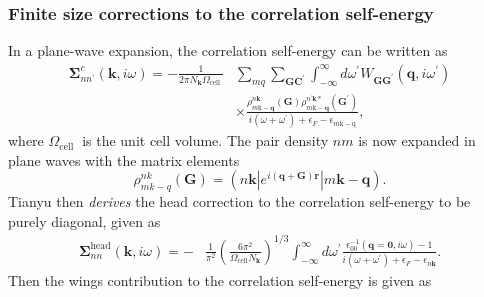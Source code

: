 \subsubsection{Finite size corrections to the correlation self-energy}
In a plane-wave expansion, the correlation self-energy can be written as 
\begin{align}
    \mathbf{\Sigma}_{n n^{\prime}}^c(\mathbf{k}, i \omega)=-\frac{1}{2 \pi N_{\mathbf{k}} \Omega_{\text {cell }}} & \sum_{m q} \sum_{\mathbf{G C}^{\prime}} \int_{-\infty}^{\infty} d \omega^{\prime} W_{\mathbf{G G}^{\prime}}\left(\mathbf{q}, i \omega^{\prime}\right) \\
& \times \frac{\rho_{m \mathrm{k}-\mathbf{q}}^{n \mathbf{k}}(\mathbf{G}) \rho_{m \mathrm{k}-\mathbf{q}}^{n^{\prime} \mathbf{k *}}\left(\mathbf{G}^{\prime}\right)}{i\left(\omega+\omega^{\prime}\right)+\epsilon_F-\epsilon_{m \mathrm{k-q}}},
\end{align}
where $\Omega_{\text {cell }}$ is the unit cell volume. The pair density $n m$ is now expanded in plane waves with the matrix elements
\begin{equation}
    \rho_{m k-q}^{n k}(\mathbf{G})=\left(n \mathbf{k}\left|e^{i(\mathbf{q}+\mathbf{G}) \mathbf{r}}\right| m \mathbf{k}-\mathbf{q}\right).
\end{equation}
Tianyu then \emph{derives} the head correction to the correlation self-energy to be purely diagonal, given as
\begin{align}
    \bm{\Sigma}_{n n}^{\mathrm{head}}(\mathbf{k}, i \omega)=- & \frac{1}{\pi^2}\left(\frac{6 \pi^2}{\Omega_{\mathrm{cell}} N_{\mathbf{k}}}\right)^{1 / 3} \int_{-\infty}^{\infty} d \omega^{\prime} \frac{\epsilon_{00}^{-1}(\mathbf{q}=\mathbf{0}, i \omega)-1}{i\left(\omega+\omega^{\prime}\right)+\epsilon_F-\epsilon_{n \mathbf{k}}} . 
\end{align}
Then the wings contribution to the correlation self-energy is given as
